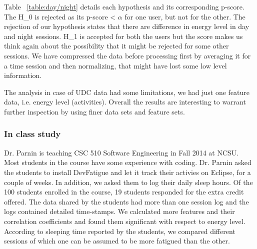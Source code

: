 \documentclass{acm_proc_article-sp}
\begin{document}
Table ~\ref{table:day/night} details each hypothesis and its corresponding
p-score. The H\_0 is rejected as its p-score < $\alpha$ for one user, but not
for the other. The rejection of our hypothesis states that there are difference
in energy level in day and night sessions. H\_1 is accepted for both the users
but the score makes us think again about the possibility that it might be
rejected for some other sessions. We have compressed the data before processing first by
averaging it for a time session and then normalizing, that might have lost some
low level information.

The analysis in case of UDC data had some limitations, we had just one
feature data, i.e. energy level (activities). Overall the results are
interesting to warrant further inspection by using finer data sets and feature sets.

\subsubsection{In class study}
Dr. Parnin is teaching CSC 510 Software Engineering in Fall 2014 at NCSU. Most
students in the course have some experience with coding. Dr. Parnin
asked the students to install DevFatigue and let it track their activies on
Eclipse, for a couple of weeks. In addition, we asked them to log their daily
sleep hours.
Of the 100 students enrolled in the course, 19 students responded for the extra
credit offered.
The data shared by the students had more than one session log and the logs
contained detailed time-stamps. We calculated more features and their
correlation coefficients and found them significant with respect to energy
level. According to sleeping time reported by the students, we compared
different sessions of which one can be assumed to be more fatigued than the
other.
\end{document}
